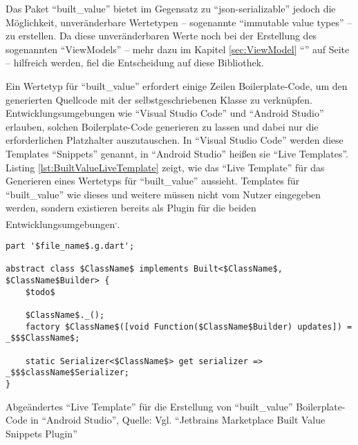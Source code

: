 Das Paket \enquote{built_value} bietet im Gegensatz zu \enquote{json-serializable} jedoch die Möglichkeit, unveränderbare Wertetypen -- sogenannte \enquote{immutable value types} -- zu erstellen.
Da diese unveränderbaren Werte noch bei der Erstellung des sogenannten \enquote{ViewModels}
-- mehr dazu im Kapitel \ref{sec:ViewModel} \enquote{} auf Seite \pageref{sec:ViewModel} -- hilfreich werden,
fiel die Entscheidung auf diese Bibliothek.

Ein Wertetyp für \enquote{built_value} erfordert einige Zeilen Boilerplate-Code, um den generierten Quellcode mit der selbstgeschriebenen Klasse zu verknüpfen.
Entwicklungsumgebungen wie \enquote{Visual Studio Code} und \enquote{Android Studio} erlauben,
solchen Boilerplate-Code generieren zu lassen und dabei nur die erforderlichen Platzhalter auszutauschen.
In \enquote{Visual Studio Code} werden diese Templates \enquote{Snippets} genannt, in \enquote{Android Studio} heißen sie \enquote{Live Templates}.
Listing \ref{lst:BuiltValueLiveTemplate} zeigt, wie das \enquote{Live Template} für das Generieren eines Wertetyps  für \enquote{built_value} aussieht.
Templates für \enquote{built_value} wie dieses und weitere müssen nicht vom Nutzer eingegeben werden,
sondern existieren bereits als Plugin für die beiden Entwicklungsumgebungen\textsuperscript{,}.


\ifIncludeFigures
  \begin{listing}[h]
    \begin{verbatim}
part '$file_name$.g.dart';

abstract class $ClassName$ implements Built<$ClassName$, $ClassName$Builder> {
    $todo$
    
    $ClassName$._();
    factory $ClassName$([void Function($ClassName$Builder) updates]) = _$$$ClassName$;

    static Serializer<$ClassName$> get serializer => _$$$className$Serializer;
}
\end{verbatim}
    \caption[Abgeändertes \enquote{Live Template} für die Erstellung von \enquote{built_value} Boilerplate-Code in \enquote{Android Studio}]{Abgeändertes \enquote{Live Template} für die Erstellung von \enquote{built_value} Boilerplate-Code in \enquote{Android Studio}, Quelle: Vgl. \enquote{Jetbrains Marketplace Built Value Snippets Plugin}}
    \label{lst:BuiltValueLiveTemplate}
  \end{listing}
\fi

